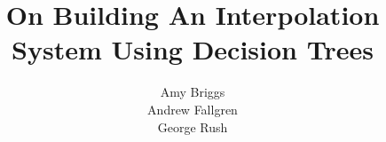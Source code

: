 \documentclass{sig-alternate}
\begin{document}
%

\title{On Building An Interpolation System Using Decision Trees}

%
%
%
%
%

%
\author{
%
%
\alignauthor
    Amy Briggs \\
\alignauthor
    Andrew Fallgren \\
\alignauthor
    George Rush \\
}
\end{document}
